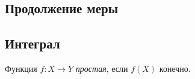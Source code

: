\subsection{Продолжение меры}

\subsection{Интеграл}
\begin{defin}
	Функция $f\colon X\to Y$ \textit{простая}, если $f(X)$ конечно.
\end{defin}